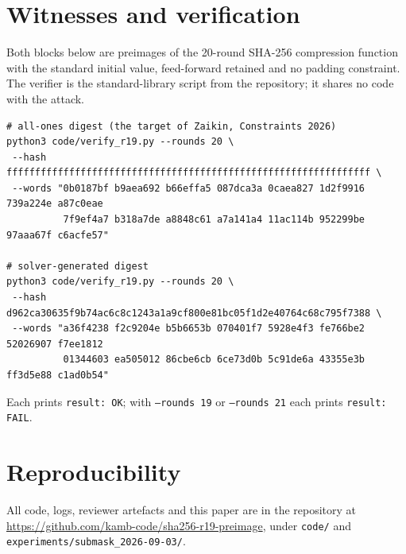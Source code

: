 \documentclass[11pt,a4paper]{article}
\begin{document}
\appendix

\section{Witnesses and verification}
\label{app:witness}

Both blocks below are preimages of the 20-round SHA-256 compression function
with the standard initial value, feed-forward retained and no padding
constraint.  The verifier is the standard-library script
 from the repository; it shares no code with the
attack.

\begin{footnotesize}
\begin{verbatim}
# all-ones digest (the target of Zaikin, Constraints 2026)
python3 code/verify_r19.py --rounds 20 \
 --hash ffffffffffffffffffffffffffffffffffffffffffffffffffffffffffffffff \
 --words "0b0187bf b9aea692 b66effa5 087dca3a 0caea827 1d2f9916 739a224e a87c0eae
          7f9ef4a7 b318a7de a8848c61 a7a141a4 11ac114b 952299be 97aaa67f c6acfe57"

# solver-generated digest
python3 code/verify_r19.py --rounds 20 \
 --hash d962ca30635f9b74ac6c8c1243a1a9cf800e81bc05f1d2e40764c68c795f7388 \
 --words "a36f4238 f2c9204e b5b6653b 070401f7 5928e4f3 fe766be2 52026907 f7ee1812
          01344603 ea505012 86cbe6cb 6ce73d0b 5c91de6a 43355e3b ff3d5e88 c1ad0b54"
\end{verbatim}
\end{footnotesize}
Each prints \texttt{result: OK}; with \texttt{--rounds 19} or \texttt{--rounds
21} each prints \texttt{result: FAIL}.

\section{Reproducibility}
\label{app:repro}

All code, logs, reviewer artefacts and this paper are in the repository at
\url{https://github.com/kamb-code/sha256-r19-preimage}, under
\texttt{code/} and \texttt{experiments/submask\_2026-09-03/}.
\end{document}
